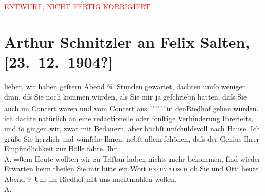 
\begin{center}
            \textcolor{red}{ENTWURF, NICHT FERTIG KORRIGIERT}
                      \end{center}
            
         
         \renewcommand{\erwaehntePersonen}{Personen: Felix Salten, Ottilie Salten}
         \renewcommand{\erwaehnteOrte}{Orte: Riedhof, Wien}
         \renewcommand{\erwaehnteWerke}{Werke: Tristan und Isolde}
               \section[Arthur Schnitzler an Felix Salten, {[}23. 12. 1904?{]}]{ Arthur Schnitzler an Felix Salten, {[}23. 12. 1904?{]}}\nopagebreak{}\rehead{ }\begin{ledgroupsized}[t]{13cm}\normalsize\beginnumbering \toendnotes[C]{\smallbreak\pagebreak[2]} 
\pstart
           \noindent{}{\pb}lieber, wir haben geſtern Abend
               ¾ Stunden gewartet, dachten umſo weniger dran, dſs Sie noch kommen würden, als Sie
               mir ja geſchriebn hatten, daſs Sie auch im Concert wären und vom Concert aus \substVorne{}\textsuperscript{\textcolor{gray}{kämen}}\substDazwischen{}in den\substHinten{}{ }Riedhof gehen {\pb}würden. ich dachte natürlich an eine
               redactionelle oder ſonſtige Verhinderung Ihrerſeits, und ſo gingen wir, zwar mit
               Bedauern, aber höchſt unſchuldsvoll nach Hause. \pend
           \pstart
           Ich grüße Sie herzlich und wünſche Ihnen, nebſt allem ſchönen, daſs der Genius Ihrer
                  {\pb}Empfindlichkeit zur Hölle fahre. \pend
           \pstart
           Ihr {\\[\baselineskip]}\spacefill\mbox{A.}\pend
           \leftskip=0em{}\pstart
           \noindent{}Heute wollten wir zu Triſtan haben nichts
                  mehr bekommen, ſind wieder Erwarten heim theilen Sie mir bitte ein Wort \introOben{}\textsc{pneumatisch}\introOben{} ob Sie und Otti heute Abend
                     9 Uhr im Riedhof mit uns nachtmahlen
                  wollen. {\\}\spacefill\mbox{A.}\pend
           

\end{ledgroupsized}

